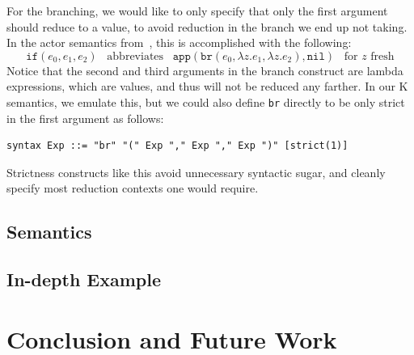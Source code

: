 \documentclass{llncs}
\begin{document}
For the branching, we would like to only specify that only the first argument
should reduce to a value, to avoid reduction in the branch we end up not taking.
In the actor semantics from~\cite{}, this is accomplished with the following:
\[ \texttt{if}(e_0, e_1, e_2) \;\;\;\text{abbreviates}\;\;\; \texttt{app}(\texttt{br}(e_0, \lambda z.e_1, \lambda z.e_2), \texttt{nil}) \;\;\;\text{for $z$ fresh} \]
Notice that the second and third arguments in the branch construct are lambda
expressions, which are values, and thus will not be reduced any farther. In our
K semantics, we emulate this, but we could also define \texttt{br} directly to
be only strict in the first argument as follows:
\begin{verbatim}
syntax Exp ::= "br" "(" Exp "," Exp "," Exp ")" [strict(1)]
\end{verbatim}
Strictness constructs like this avoid unnecessary syntactic sugar, and cleanly
specify most reduction contexts one would require.

\subsection{Semantics}

\subsection{In-depth Example}

\section{Conclusion and Future Work}

%
%



\end{document}
